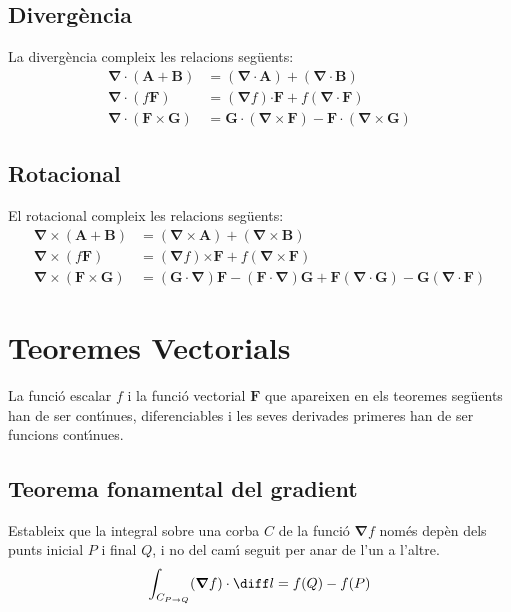 \documentclass[catalan,a4paper,twoside,11pt]{article}
\begin{document}
\subsection{Diverg\`{e}ncia}
La diverg\`{e}ncia compleix les relacions seg\"{u}ents:
\begin{align}
    \boldsymbol{\nabla\cdot}(\boldsymbol{A}+\boldsymbol{B}) &= (\boldsymbol{\nabla\cdot A}) +
    (\boldsymbol{\nabla\cdot B})\\
    \boldsymbol{\nabla\cdot}(f\boldsymbol{F}) &=
    (\boldsymbol{\nabla}f)\boldsymbol{\cdot F} + f(\boldsymbol{\nabla\cdot F})\\
       \boldsymbol{\nabla\cdot}(\boldsymbol{F\times G}) &=
    \boldsymbol{G\cdot}(\boldsymbol{\nabla\times F}) -
    \boldsymbol{F\cdot}(\boldsymbol{\nabla\times G})
\end{align}

\subsection{Rotacional}
El rotacional compleix les relacions seg\"{u}ents:
\begin{align}
    \boldsymbol{\nabla\times}(\boldsymbol{A}+\boldsymbol{B}) &= (\boldsymbol{\nabla\times A}) + (\boldsymbol{\nabla\times B})\\
    \boldsymbol{\nabla\times}(f\boldsymbol{F}) &=
    (\boldsymbol{\nabla}f)\boldsymbol{\times F} + f(\boldsymbol{\nabla\times F})\\
    \boldsymbol{\nabla\times}(\boldsymbol{F\times G}) &= (\boldsymbol{G\cdot\nabla})\boldsymbol{F} - (\boldsymbol{F\cdot\nabla})\boldsymbol{G} + \boldsymbol{F}(\boldsymbol{\nabla\cdot G}) - \boldsymbol{G}(\boldsymbol{\nabla\cdot F})
\end{align}


\section{Teoremes Vectorials}

La funci\'{o} escalar $f$ i la funci\'{o} vectorial $\boldsymbol{F}$ que apareixen en els teoremes seg\"{u}ents han de ser cont\'{\i}nues, diferenciables i les seves derivades primeres han de ser funcions cont\'{\i}nues.

\subsection{Teorema fonamental del gradient}
Estableix que la integral sobre una corba $C$ de la funci\'{o} $\boldsymbol{\nabla} f$ nom\'{e}s dep\`{e}n dels punts inicial $P$ i final $Q$, i no del cam\'{\i} seguit per anar de l'un a l'altre.
\begin{equation}
    \int_{C_{P\rightarrow Q}} (\boldsymbol{\nabla}f) \cdot \diff l = f(Q)-f(P)
\end{equation}
\end{document}
